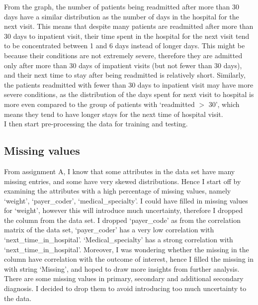 \documentclass[letterpaper, 12 pt, conference]{ieeeconf}  %
\begin{document}
From the graph, the number of patients being readmitted after more than 30 days have a similar distribution as the number of days in the hospital for the next visit. This  means that despite many patients are readmitted after more than 30 days to inpatient visit, their time spent in the hospital for the next visit tend to be concentrated between 1 and 6 days instead of longer days. This might be because their conditions are not extremely severe, therefore they are admitted only after more than 30 days of impatient visits (but not fewer than 30 days), and their next time to stay after being readmitted is relatively short. Similarly, the patients readmitted with fewer than 30 days to inpatient visit may have more severe conditions, as the distribution of the days spent for next visit to hospital is more even compared to the group of patients with `readmitted $>$ 30', which means they tend to have longer stays for the next time of hospital visit.\\
\newline
 I then start pre-processing the data for training and testing.
 
\subsection{Missing values}
From assignment A, I know that some attributes in the data set have many missing entries, and some have very skewed distributions. Hence I start off by examining the attributes with a high percentage of missing values, namely `weight', `payer\_coder', `medical\_specialty'. I could have filled in missing values for `weight', however this will introduce much uncertainty, therefore I dropped the column from the data set. I dropped `payer\_code' as from the correlation matrix of the data set, `payer\_coder' has a very low correlation with `next\_time\_in\_hospital'. `Medical\_specialty' has a strong correlation with `next\_time\_in\_hospital'. Moreover, I was wondering whether the missing in the column have correlation with the outcome of interest, hence I filled the missing in with string `Missing', and hoped to draw more insights from further analysis. There are some missing values in primary, secondary and additional secondary diagnosis. I decided to drop them to avoid introducing too much uncertainty to the data.
\end{document}
